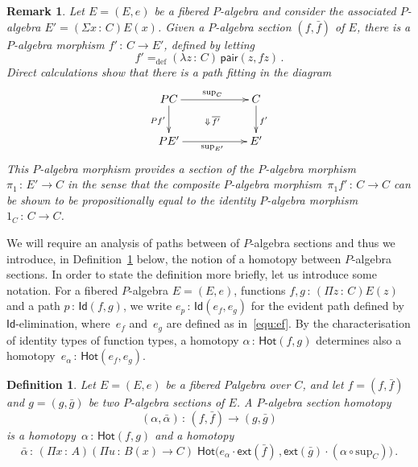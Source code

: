 \documentclass[10pt,a4paper,oneside,reqno]{amsart}
\numberwithin{equation}{section}
\theoremstyle{mythm}
\theoremstyle{mydef}
\newtheorem{definition}[theorem]{Definition}
\theoremstyle{myrmk}
\newtheorem*{remark*}{Remark}
\newcommand{\defeq}{=_{\mathrm{def}}}
\newcommand{\co}{\,{:}\,}
\newcommand{\ct}{\cdot}
\newcommand{\Hot}{\mathsf{Hot}}
\newcommand{\ext}{\mathsf{ext}}
\newcommand{\Id}{\mathsf{Id}}
\newcommand{\pair}{\mathsf{pair}}
\renewcommand{\sup}{\mathrm{sup}}
\begin{document}
\begin{remark*} Let $E = (E, e)$ be a fibered $P$-algebra and consider the associated $P$-algebra
 $E' = (\Sigma x \co C) E(x)$. Given a $P$-algebra section $(f, \bar{f})$ of $E$, there is a $P$-algebra 
morphism $f' \co C \to E'$, defined by letting
\[
f' \defeq (\lambda z \co C) \, \pair(z, fz) \, .
\] 
Direct calculations show that there is a path fitting in the diagram
\[
\xymatrix@C=2cm{
PC \ar[d]_{Pf'} \ar[r]^{\sup_C} \ar@{}[dr]|{\Downarrow \, \overline{f'}} & C \ar[d]^{f'} \\
PE' \ar[r]_{\sup_{E'} } & E'}
\]
This $P$-algebra morphism provides
a section of the $P$-algebra morphism~$\pi_1 \co E' \to C$ in the sense that the composite $P$-algebra
morphism~$\pi_1  f' \co C \to C$ can be shown to be propositionally equal to the identity $P$-algebra
morphism~$1_C \co C \to C$. 
\end{remark*}

\medskip


We will require an analysis of paths between of $P$-algebra sections and thus we introduce, in Definition~\ref{def:W2cellsection} below, the
notion of a homotopy between $P$-algebra sections. In order to state the definition more briefly, let us introduce some
notation. For a fibered $P$-algebra $E = (E,e)$, functions $f, g \co (\Pi z \co C) E(z)$ and a path $p \co
\Id(f,g)$, we write $e_p \co \Id(e_f, e_g)$ for the evident path defined by $\Id$-elimination, 
where~$e_f$ and~$e_g$ are defined as in~\eqref{equ:ef}. By the characterisation of identity types of
function types,  a homotopy $\alpha \co \Hot(f,g)$ determines also 
a homotopy~$e_\alpha \co \Hot(e_f, e_g)$. 

\begin{definition} \label{def:W2cellsection} Let $E = (E, e)$ be a fibered $P$algebra over $C$, and let $f = (f, \bar{f})$ and $g = (g, \bar{g})$ be two $P$-algebra sections of $E$.  A \emph{$P$-algebra section homotopy} 
\[
(\alpha , \bar{\alpha}) \co (f, \bar{f})  \rightarrow (g, \bar{g})
\] 
is a homotopy~$\alpha \co \Hot(f, g)$ and a homotopy
\[
\bar{\alpha} \co 
(\Pi x \co A) (\Pi u \co B(x) \to C) \;
\Hot\big(  e_\alpha \ct \ext( \bar{f}) \, , 
 \ext( \bar{g}) \ct (\alpha \circ \sup_C)   \big) \, .
\]
\end{definition} 
\end{document}

